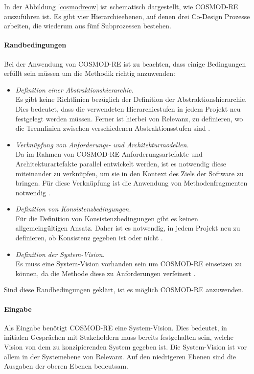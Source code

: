 In der Abbildung \ref{cosmodreow} ist schematisch dargestellt, wie COSMOD-RE auszuf\"uhren ist. Es gibt vier Hierarchieebenen, auf denen drei Co-Design Prozesse arbeiten, die wiederum aus f\"unf Subprozessen bestehen.\\

\paragraph{Randbedingungen}
Bei der Anwendung von COSMOD-RE ist zu beachten, dass einige Bedingungen erf\"ullt sein m\"ussen um die Methodik richtig anzuwenden:\\

\begin{itemize}
\item \emph{Definition einer Abstraktionshierarchie.} \\
Es gibt keine Richtlinien bez\"uglich der Definition der Abstraktionshierarchie. Dies bedeutet, dass die verwendeten Hierarchiestufen in jedem Projekt neu festgelegt werden m\"ussen. Ferner ist hierbei von Relevanz, zu definieren, wo die Trennlinien zwischen verschiedenen Abstraktionsstufen sind \cite{Sik01}.
\item \emph{Verkn\"upfung von Anforderungs- und Architekturmodellen.} \\
Da im Rahmen von COSMOD-RE Anforderungsartefakte und Architekturartefakte parallel entwickelt werden, ist es notwendig diese miteinander zu verkn\"upfen, um sie in den Kontext des Ziels der Software zu bringen. F\"ur diese Verkn\"upfung ist die Anwendung von Methodenfragmenten notwendig \cite{Sik01}.
\item \emph{Definition von Konsistenzbedingungen.} \\
F\"ur die Definition von Konsistenzbedingungen gibt es keinen allgemeing\"ultigen Ansatz. Daher ist es notwendig, in jedem Projekt neu zu definieren, ob Konsistenz gegeben ist oder nicht \cite{Sik01}.
\item \emph{Definition der System-Vision.} \\
Es muss eine System-Vision vorhanden sein um COSMOD-RE einsetzen zu k\"onnen, da die Methode diese zu Anforderungen verfeinert \cite{Poh01}.\\
\end{itemize}

Sind diese Randbedingungen gekl\"art, ist es m\"oglich COSMOD-RE anzuwenden.\\

\paragraph{Eingabe}
Als Eingabe ben\"otigt COSMOD-RE eine System-Vision. Dies bedeutet, in initialen Gespr\"achen mit Stakeholdern muss bereits festgehalten sein, welche Vision von dem zu konzipierenden System gegeben ist. Die System-Vision ist vor allem in der Systemebene von Relevanz. Auf den niedrigeren Ebenen sind die Ausgaben der oberen Ebenen bedeutsam.\\

